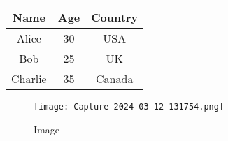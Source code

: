 \documentclass{article}
\begin{document}
\begin{tabular}{c|c|c}
\hline
Name & Age & Country \\
\hline
Alice & 30 & USA \\
\hline
Bob & 25 & UK \\
\hline
Charlie & 35 & Canada \\
\hline
\end{tabular}\begin{figure}[h!]
\centering
\texttt{[image: Capture-2024-03-12-131754.png]}
\caption{Image}
\label{fig:image}
\end{figure}
\end{document}
